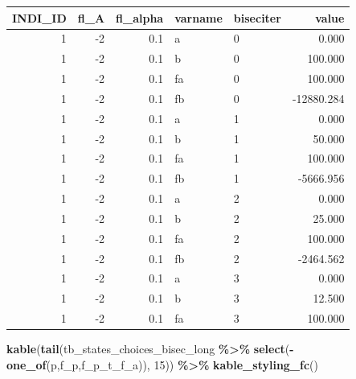 \documentclass[
]{book}
\newenvironment{Shaded}{\begin{snugshade}}{\end{snugshade}}
\newcommand{\DecValTok}[1]{\textcolor[rgb]{0.00,0.00,0.81}{#1}}
\newcommand{\KeywordTok}[1]{\textcolor[rgb]{0.13,0.29,0.53}{\textbf{#1}}}
\newcommand{\NormalTok}[1]{#1}
\newcommand{\OperatorTok}[1]{\textcolor[rgb]{0.81,0.36,0.00}{\textbf{#1}}}
\newcommand{\StringTok}[1]{\textcolor[rgb]{0.31,0.60,0.02}{#1}}
\begin{document}
\begin{table}[!h]
\centering
\begin{tabular}{r|r|r|l|l|r}
\hline
INDI\_ID & fl\_A & fl\_alpha & varname & biseciter & value\\
\hline
\rowcolor{gray!6}  1 & -2 & 0.1 & a & 0 & 0.000\\
\hline
1 & -2 & 0.1 & b & 0 & 100.000\\
\hline
\rowcolor{gray!6}  1 & -2 & 0.1 & fa & 0 & 100.000\\
\hline
1 & -2 & 0.1 & fb & 0 & -12880.284\\
\hline
\rowcolor{gray!6}  1 & -2 & 0.1 & a & 1 & 0.000\\
\hline
1 & -2 & 0.1 & b & 1 & 50.000\\
\hline
\rowcolor{gray!6}  1 & -2 & 0.1 & fa & 1 & 100.000\\
\hline
1 & -2 & 0.1 & fb & 1 & -5666.956\\
\hline
\rowcolor{gray!6}  1 & -2 & 0.1 & a & 2 & 0.000\\
\hline
1 & -2 & 0.1 & b & 2 & 25.000\\
\hline
\rowcolor{gray!6}  1 & -2 & 0.1 & fa & 2 & 100.000\\
\hline
1 & -2 & 0.1 & fb & 2 & -2464.562\\
\hline
\rowcolor{gray!6}  1 & -2 & 0.1 & a & 3 & 0.000\\
\hline
1 & -2 & 0.1 & b & 3 & 12.500\\
\hline
\rowcolor{gray!6}  1 & -2 & 0.1 & fa & 3 & 100.000\\
\hline
\end{tabular}
\end{table}

\begin{Shaded}
\begin{Highlighting}[]
\KeywordTok{kable}\NormalTok{(}\KeywordTok{tail}\NormalTok{(tb\_states\_choices\_bisec\_long }\OperatorTok{\%\textgreater{}\%}\StringTok{ }
\StringTok{             }\KeywordTok{select}\NormalTok{(}\OperatorTok{{-}}\KeywordTok{one\_of}\NormalTok{(}\StringTok{\textquotesingle{}p\textquotesingle{}}\NormalTok{,}\StringTok{\textquotesingle{}f\_p\textquotesingle{}}\NormalTok{,}\StringTok{\textquotesingle{}f\_p\_t\_f\_a\textquotesingle{}}\NormalTok{)), }\DecValTok{15}\NormalTok{)) }\OperatorTok{\%\textgreater{}\%}\StringTok{ }
\StringTok{  }\KeywordTok{kable\_styling\_fc}\NormalTok{()}
\end{Highlighting}
\end{Shaded}
\end{document}
